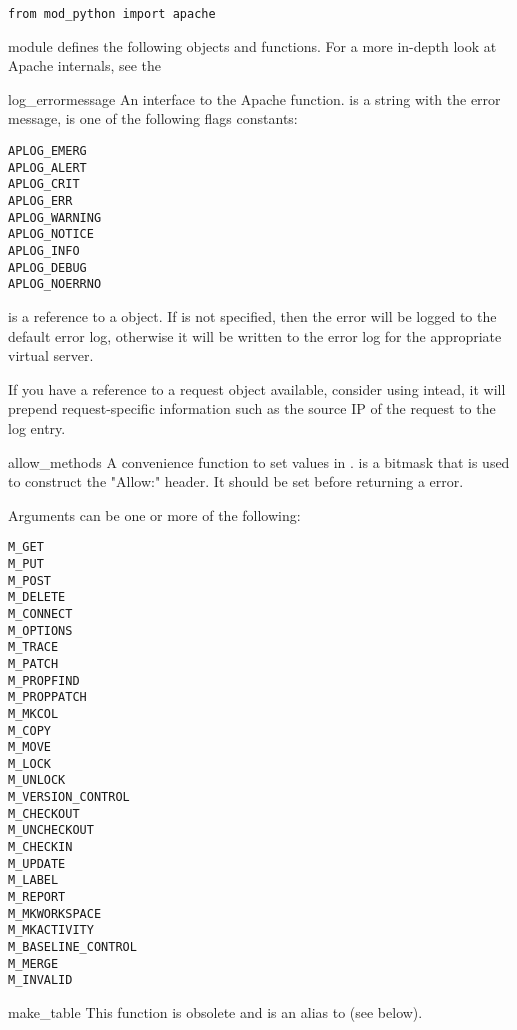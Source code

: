 \begin{verbatim}
from mod_python import apache
\end{verbatim}

 module defines the following objects and
functions. For a more in-depth look at Apache internals, see the

\begin{funcdesc}{log_error}{message}
An interface to the Apache
function.  is a string with the error message,  is
one of the following flags constants:

\begin{verbatim}
APLOG_EMERG
APLOG_ALERT
APLOG_CRIT
APLOG_ERR
APLOG_WARNING
APLOG_NOTICE
APLOG_INFO
APLOG_DEBUG
APLOG_NOERRNO
\end{verbatim}            
      
 is a reference to a  object. If
 is not specified, then the error will be logged to the
default error log, otherwise it will be written to the error log for
the appropriate virtual server.

If you have a reference to a request object available, consider using
 intead, it will prepend request-specific
information such as the source IP of the request to the log entry.
\end{funcdesc}

\begin{funcdesc}{allow_methods}{}
A convenience function to set values in .
 is a bitmask that is used to construct the
"Allow:" header. It should be set before returning a
 error.

Arguments can be one or more of the following:
\begin{verbatim}
M_GET
M_PUT
M_POST
M_DELETE
M_CONNECT
M_OPTIONS
M_TRACE
M_PATCH
M_PROPFIND
M_PROPPATCH
M_MKCOL
M_COPY
M_MOVE
M_LOCK
M_UNLOCK
M_VERSION_CONTROL
M_CHECKOUT
M_UNCHECKOUT
M_CHECKIN
M_UPDATE
M_LABEL
M_REPORT
M_MKWORKSPACE
M_MKACTIVITY
M_BASELINE_CONTROL
M_MERGE
M_INVALID
\end{verbatim}

\end{funcdesc}

\begin{funcdesc}{make_table}{} 
This function is obsolete and is an alias to  (see below).
\end{funcdesc}

